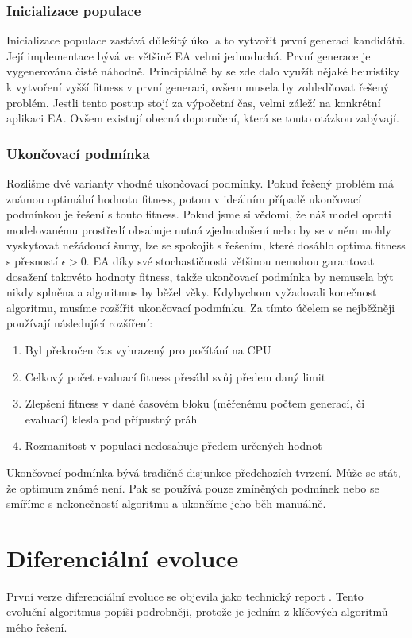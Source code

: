 \subsubsection{Inicializace populace}
Inicializace populace zastává důležitý úkol a to vytvořit první generaci kandidátů. Její implementace bývá ve většině EA velmi jednoduchá. První generace je vygenerována čistě náhodně. Principiálně by se zde dalo využít nějaké heuristiky k vytvoření vyšší fitness v první generaci, ovšem musela by zohledňovat řešený problém. Jestli tento postup stojí za výpočetní čas, velmi záleží na konkrétní aplikaci EA. Ovšem existují obecná doporučení, která se touto otázkou zabývají. 
\subsubsection{Ukončovací podmínka}
Rozlišme dvě varianty vhodné ukončovací podmínky. Pokud řešený problém má známou optimální hodnotu fitness, potom v ideálním případě ukončovací podmínkou je řešení s touto fitness. Pokud jsme si vědomi, že náš model oproti modelovanému prostředí obsahuje nutná zjednodušení nebo by se v něm mohly vyskytovat nežádoucí šumy, lze se spokojit s řešením, které dosáhlo optima fitness s přesností $\epsilon > 0$. EA díky své stochastičnosti většinou nemohou garantovat dosažení takovéto hodnoty fitness, takže ukončovací podmínka by nemusela být nikdy splněna a algoritmus by běžel věky. Kdybychom vyžadovali konečnost algoritmu, musíme rozšířit ukončovací podmínku. Za tímto účelem se nejběžněji používají následující rozšíření: \par
\begin{enumerate}
\item Byl překročen čas vyhrazený pro počítání na CPU
\item Celkový počet evaluací fitness přesáhl svůj předem daný limit 
\item Zlepšení fitness v dané časovém bloku (měřenému počtem generací, či evaluací) klesla pod přípustný práh
\item Rozmanitost v populaci nedosahuje předem určených hodnot
\end{enumerate}
Ukončovací podmínka bývá tradičně disjunkce předchozích tvrzení. Může se stát, že optimum známé není. Pak se používá pouze zmíněných podmínek nebo se smíříme s nekonečností algoritmu a ukončíme jeho běh manuálně.
\section{Diferenciální evoluce}
\label{sec:DE}
První verze diferenciální evoluce se objevila jako technický report \cite{storn1997differential}. Tento evoluční algoritmus popíši podrobněji, protože je jedním z klíčových algoritmů mého řešení.
